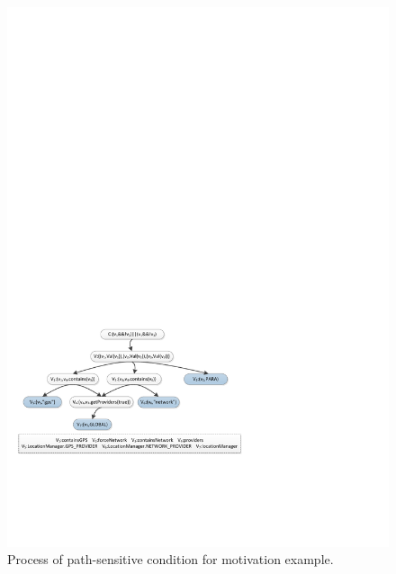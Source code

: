 
\begin{figure}[!t]  
  \centering  
  \includegraphics[width=1\linewidth]{pic/motivationCondition.pdf}  
  \caption{Process of path-sensitive condition for motivation example.}  
  \label{fig:motConds}  
\end{figure}

